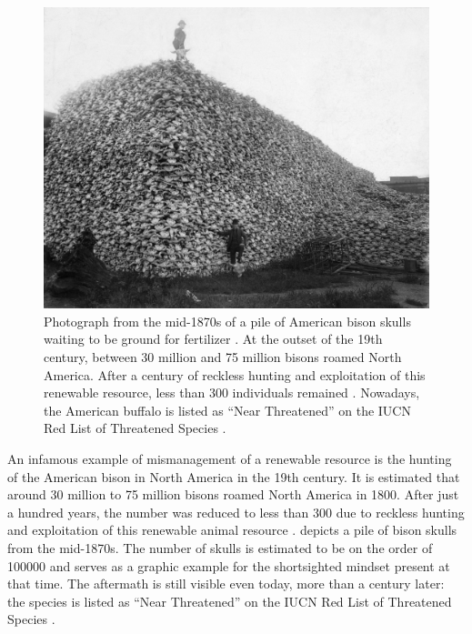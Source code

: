 \begin{figure}
	\begin{center}
		\includegraphics[width=\textwidth]{fig/Bison_skull_pile_grey_stretched_small.jpg}
		\caption[Overuse of Renewable Resources: A Pile of Bison Skulls]{Photograph from the mid-1870s of a pile of American bison skulls waiting to be ground for fertilizer \cite{Anonymous1870}. At the outset of the 19th century, between \num{30} million and \num{75} million bisons roamed North America. After a century of reckless hunting and exploitation of this renewable resource, less than \num{300} individuals remained \cite{USFWS1997}. Nowadays, the American buffalo is listed as \enquote{Near Threatened} on the IUCN Red List of Threatened Species \cite{IUCNRedList20154}.\label{fig-intro-renewable-overuse}}
	\end{center}
\end{figure}

An infamous example of mismanagement of a renewable resource is the hunting of the American bison in North America in the 19th century. It is estimated that around \num{30} million to \num{75} million bisons roamed North America in 1800. After just a hundred years, the number was reduced to less than \num{300} due to reckless hunting and exploitation of this renewable animal resource \cite{USFWS1997}.  depicts a pile of bison skulls from the mid-1870s. The number of skulls is estimated to be on the order of \num{100000} and serves as a graphic example for the shortsighted mindset present at that time. The aftermath is still visible even today, more than a century later: the species is listed as \enquote{Near Threatened} on the IUCN Red List of Threatened Species \cite{IUCNRedList20154}.

